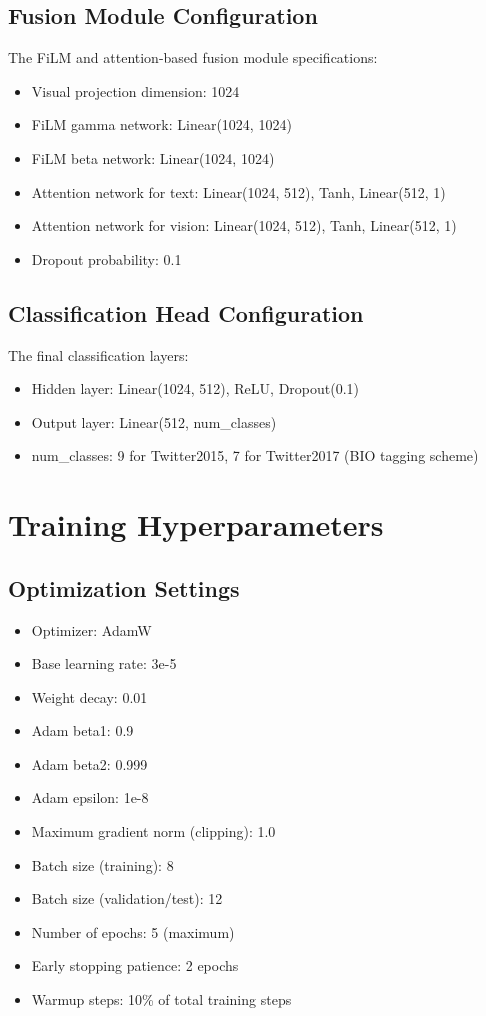 \documentclass[12pt,a4paper]{report}
\begin{document}
\subsection{Fusion Module Configuration}

The FiLM and attention-based fusion module specifications:
\begin{itemize}
\item Visual projection dimension: 1024
\item FiLM gamma network: Linear(1024, 1024)
\item FiLM beta network: Linear(1024, 1024)
\item Attention network for text: Linear(1024, 512), Tanh, Linear(512, 1)
\item Attention network for vision: Linear(1024, 512), Tanh, Linear(512, 1)
\item Dropout probability: 0.1
\end{itemize}

\subsection{Classification Head Configuration}

The final classification layers:
\begin{itemize}
\item Hidden layer: Linear(1024, 512), ReLU, Dropout(0.1)
\item Output layer: Linear(512, num\_classes)
\item num\_classes: 9 for Twitter2015, 7 for Twitter2017 (BIO tagging scheme)
\end{itemize}

\section{Training Hyperparameters}

\subsection{Optimization Settings}

\begin{itemize}
\item Optimizer: AdamW
\item Base learning rate: 3e-5
\item Weight decay: 0.01
\item Adam beta1: 0.9
\item Adam beta2: 0.999
\item Adam epsilon: 1e-8
\item Maximum gradient norm (clipping): 1.0
\item Batch size (training): 8
\item Batch size (validation/test): 12
\item Number of epochs: 5 (maximum)
\item Early stopping patience: 2 epochs
\item Warmup steps: 10\% of total training steps
\end{itemize}
\end{document}
